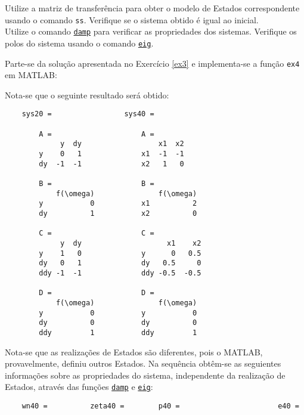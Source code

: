 \documentclass{article}
\begin{document}
\newpage\begin{exercise}\label{ex4}
    Utilize a matriz de transferência para obter o modelo de Estados correspondente usando o comando \texttt{ss}. Verifique se o sistema obtido é igual ao inicial.\\

    Utilize o comando \href{https://www.mathworks.com/help/control/ref/lti.damp.html}{\texttt{damp}} para verificar as propriedades dos sistemas. Verifique os polos do sistema usando o comando \href{https://www.mathworks.com/help/matlab/ref/eig.html}{\texttt{eig}}.
\end{exercise}
\begin{resolution}
    Parte-se da solução apresentada no Exercício \ref{ex3} e implementa-se a função \texttt{ex4} em MATLAB:
    \begin{scriptsize}
        \myMatlab
    \end{scriptsize}
    Nota-se que o seguinte resultado será obtido:
    \begin{scriptsize}
        \myMatlab\begin{lstlisting}
    sys20 =                 sys40 =
                            
        A =                     A = 
             y  dy                  x1  x2
        y    0   1              x1  -1  -1
        dy  -1  -1              x2   1   0
                            
        B =                     B = 
            f(\omega)               f(\omega)
        y           0           x1          2
        dy          1           x2          0
                            
        C =                     C = 
             y  dy                    x1    x2
        y    1   0              y      0   0.5
        dy   0   1              dy   0.5     0
        ddy -1  -1              ddy -0.5  -0.5
                                
        D =                     D = 
            f(\omega)               f(\omega)
        y           0           y           0
        dy          0           dy          0
        ddy         1           ddy         1
        \end{lstlisting}
    \end{scriptsize}
    Nota-se que as realizações de Estados são diferentes, pois o MATLAB, provavelmente, definiu outros Estados. Na sequência obtêm-se as seguientes informações sobre as propriedades do sistema, independente da realização de Estados, através das funções \href{https://www.mathworks.com/help/control/ref/lti.damp.html}{\texttt{damp}} e \href{https://www.mathworks.com/help/matlab/ref/eig.html}{\texttt{eig}}: 
    \begin{scriptsize}
        \myMatlab\begin{lstlisting}
    wn40 =          zeta40 =        p40 =                       e40 =


\end{lstlisting}
\end{scriptsize}
\end{resolution}
\end{document}
